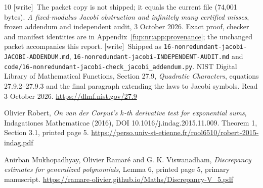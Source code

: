 \documentclass[11pt,letterpaper]{article}
\newcommand{\fupR}{0}
\renewcommand{\thesection}{\fupR.\arabic{section}}
\renewcommand{\theHsection}{\fupR.\arabic{section}}
\newcommand{\fupstart}[2]{%
  \renewcommand{\fupR}{#1}\setcounter{section}{0}\setcounter{equation}{0}%
  \renewcommand{\thesection}{\fupR.\arabic{section}}%
  \renewcommand{\theHsection}{\fupR.\arabic{section}}%
  \renewcommand{\fuphead}{#2}}
\newcommand{\fuphead}{Front matter}
\theoremstyle{definition}\newtheorem{definition}[theorem]{Definition}
\theoremstyle{remark}\newtheorem{remark}[theorem]{Remark}
\newcommand{\code}[1]{\texttt{\detokenize{#1}}}
\newcommand{\wtag}{\textup{[write]}}
\newcommand{\rw}[1]{\nolinkurl{#1}}%
\begin{document}
\begin{thebibliography}{10}
 \wtag\ The packet copy \code{projection.snapshot.json} is not shipped; it equals the current file (74,001 bytes).
\emph{A fixed-modulus Jacobi obstruction and infinitely many certified misses}, frozen addendum and independent audit, 3 October 2026. Exact proof, checker and manifest identities are in Appendix~\ref{fup:nr:app:provenance}; the unchanged packet accompanies this report.
 \wtag\ Shipped as \rw{16-nonredundant-jacobi-JACOBI-ADDENDUM.md}, \rw{16-nonredundant-jacobi-INDEPENDENT-AUDIT.md} and \rw{code/16-nonredundant-jacobi-check_jacobi_addendum.py}.
NIST Digital Library of Mathematical Functions, Section 27.9, \emph{Quadratic Characters}, equations 27.9.2--27.9.3 and the final paragraph extending the laws to Jacobi symbols. Read 3 October 2026.
\url{https://dlmf.nist.gov/27.9}

Olivier Robert, \emph{On van der Corput's $k$-th derivative test for exponential sums}, Indagationes Mathematicae (2016), DOI 10.1016/j.indag.2015.11.009. Theorem 1, Section 3.1, printed page 5.
\url{https://perso.univ-st-etienne.fr/rool6510/robert-2015-indag.pdf}

Anirban Mukhopadhyay, Olivier Ramar\'e and G. K. Viswanadham, \emph{Discrepancy estimates for generalized polynomials}, Lemma 6, printed page 5, primary manuscript.
\url{https://ramare-olivier.github.io/Maths/Discrepancy-V_5.pdf}
\end{thebibliography}

\clearpage
\fupstart{41}{Part VII: Report 41}
\end{document}
